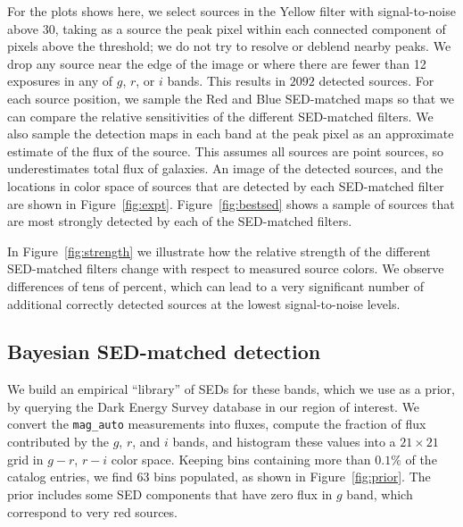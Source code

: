 \documentclass[11pt,letterpaper,linenumbers]{aastex63}
\newcommand{\figref}[1]{\mbox{Figure~\ref{#1}}}
\begin{document}
For the plots shows here, we select sources in the Yellow filter with
signal-to-noise above $30$, taking as a source the peak pixel within
each connected component of pixels above the threshold; we do not try
to resolve or deblend nearby peaks.  We drop any source near the edge
of the image or where there are fewer than 12 exposures in any of $g$,
$r$, or $i$ bands.  This results in $2092$ detected sources.  For each
source position, we sample the Red and Blue SED-matched maps so that
we can compare the relative sensitivities of the different SED-matched
filters.  We also sample the detection maps in each band at the peak
pixel as an approximate estimate of the flux of the source.  This
assumes all sources are point sources, so underestimates total flux of
galaxies.  An image of the detected sources, and the locations in
color space of sources that are detected by each SED-matched filter
are shown in \figref{fig:expt}.  \figref{fig:bestsed} shows a sample
of sources that are most strongly detected by each of the SED-matched
filters.


In \figref{fig:strength} we illustrate how the relative strength of
the different SED-matched filters change with respect to measured
source colors.  We observe differences of tens of percent, which can
lead to a very significant number of additional correctly detected sources at
the lowest signal-to-noise levels.

\subsection{Bayesian SED-matched detection}

We build an empirical ``library'' of SEDs for these bands, which we
use as a prior, by querying the Dark Energy Survey database in our
region of interest.  We convert the \texttt{mag\_auto} measurements
into fluxes, compute the fraction of flux contributed by the $g$, $r$,
and $i$ bands, and histogram these values into a $21 \times 21$ grid in
$g-r$, $r-i$ color space.
Keeping bins containing more than $0.1 \%$ of the catalog entries, we
find 63 bins populated, as shown in \figref{fig:prior}.  The prior
includes some SED components that have zero flux in $g$ band, which
correspond to very red sources.
\end{document}
